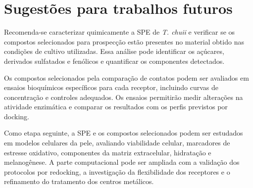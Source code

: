 \section{Sugestões para trabalhos futuros}
Recomenda-se caracterizar quimicamente a SPE de \textit{T. chuii} e verificar se os compostos selecionados para prospecção estão presentes no material obtido nas condições de cultivo utilizadas. Essa análise pode identificar os açúcares, derivados sulfatados e fenólicos e quantificar os componentes detectados.

Os compostos selecionados pela comparação de contatos podem ser avaliados em ensaios bioquímicos específicos para cada receptor, incluindo curvas de concentração e controles adequados. Os ensaios permitirão medir alterações na atividade enzimática e comparar os resultados com os perfis previstos por docking.

Como etapa seguinte, a SPE e os compostos selecionados podem ser estudados em modelos celulares da pele, avaliando viabilidade celular, marcadores de estresse oxidativo, componentes da matriz extracelular, hidratação e melanogênese. A parte computacional pode ser ampliada com a validação dos protocolos por redocking, a investigação da flexibilidade dos receptores e o refinamento do tratamento dos centros metálicos.
